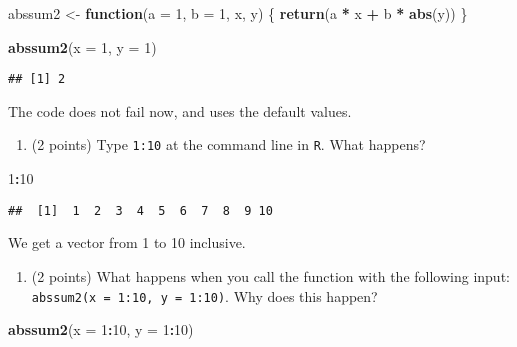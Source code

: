 \documentclass[]{article}
\newenvironment{Shaded}{\begin{snugshade}}{\end{snugshade}}
\newcommand{\ControlFlowTok}[1]{\textcolor[rgb]{0.13,0.29,0.53}{\textbf{#1}}}
\newcommand{\DataTypeTok}[1]{\textcolor[rgb]{0.13,0.29,0.53}{#1}}
\newcommand{\DecValTok}[1]{\textcolor[rgb]{0.00,0.00,0.81}{#1}}
\newcommand{\KeywordTok}[1]{\textcolor[rgb]{0.13,0.29,0.53}{\textbf{#1}}}
\newcommand{\NormalTok}[1]{#1}
\newcommand{\OperatorTok}[1]{\textcolor[rgb]{0.81,0.36,0.00}{\textbf{#1}}}
\newcommand{\StringTok}[1]{\textcolor[rgb]{0.31,0.60,0.02}{#1}}
\providecommand{\tightlist}{%
  \setlength{\itemsep}{0pt}\setlength{\parskip}{0pt}}
\begin{document}
\begin{Shaded}
\begin{Highlighting}[]
\NormalTok{abssum2 <-}\StringTok{ }\ControlFlowTok{function}\NormalTok{(}\DataTypeTok{a =} \DecValTok{1}\NormalTok{, }\DataTypeTok{b =} \DecValTok{1}\NormalTok{, x, y) \{}
    \KeywordTok{return}\NormalTok{(a }\OperatorTok{*}\StringTok{ }\NormalTok{x }\OperatorTok{+}\StringTok{ }\NormalTok{b }\OperatorTok{*}\StringTok{ }\KeywordTok{abs}\NormalTok{(y))}
\NormalTok{\}}

\KeywordTok{abssum2}\NormalTok{(}\DataTypeTok{x =} \DecValTok{1}\NormalTok{, }\DataTypeTok{y =} \DecValTok{1}\NormalTok{)}
\end{Highlighting}
\end{Shaded}

\begin{verbatim}
## [1] 2
\end{verbatim}

The code does not fail now, and uses the default values.

\begin{enumerate}
\def\labelenumi{\alph{enumi}.}
\setcounter{enumi}{4}
\tightlist
\item
  (2 points) Type \texttt{1:10} at the command line in \texttt{R}. What
  happens?
\end{enumerate}

\begin{Shaded}
\begin{Highlighting}[]
\DecValTok{1}\OperatorTok{:}\DecValTok{10}
\end{Highlighting}
\end{Shaded}

\begin{verbatim}
##  [1]  1  2  3  4  5  6  7  8  9 10
\end{verbatim}

We get a vector from 1 to 10 inclusive.

\begin{enumerate}
\def\labelenumi{\alph{enumi}.}
\setcounter{enumi}{5}
\tightlist
\item
  (2 points) What happens when you call the function with the following
  input: \texttt{abssum2(x\ =\ 1:10,\ y\ =\ 1:10)}. Why does this
  happen?
\end{enumerate}

\begin{Shaded}
\begin{Highlighting}[]
\KeywordTok{abssum2}\NormalTok{(}\DataTypeTok{x =} \DecValTok{1}\OperatorTok{:}\DecValTok{10}\NormalTok{, }\DataTypeTok{y =} \DecValTok{1}\OperatorTok{:}\DecValTok{10}\NormalTok{)}
\end{Highlighting}
\end{Shaded}
\end{document}
